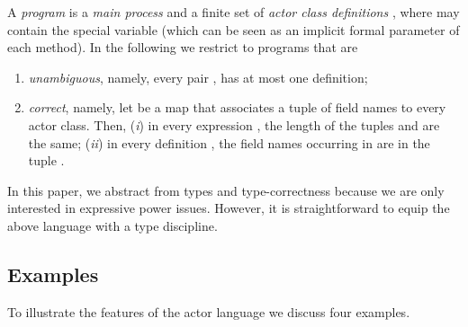 \documentclass{LMCS}
\theoremstyle{plain}\newtheorem{proposition}[thm]{Proposition}
\theoremstyle{plain}\newtheorem{lemma}[thm]{Lemma}
\theoremstyle{plain}\newtheorem{theorem}[thm]{Theorem}
\theoremstyle{plain}\newtheorem{corollary}[thm]{Corollary}
\newif\ifcamera \camerafalse
\begin{document}
A \emph{program} is a \emph{main process}  and a finite set of \emph{actor class 
definitions} , where  may contain the special 
variable  (which can be seen as an implicit formal parameter of each method). In the following we restrict to programs that are
\begin{enumerate}
\item
\emph{unambiguous}, namely, every pair ,  has at most one definition;
\item
\emph{correct}, namely, let  be
a map that associates a tuple of 
field names to every actor class. Then, 
(\emph{i}) in every expression , the length of the 
tuples  and  are the same;
(\emph{ii}) in every definition , the field names 
occurring in  are in the tuple  .
\end{enumerate}
In this paper, we abstract from types and type-correctness because we are
only interested in expressive power issues. However, it is 
straightforward to equip the above language with a type discipline.

\ifcamera
\else
\subsection{Examples}
\label{sec.examples}
To illustrate the features of the actor language we discuss four
examples.
\end{document}
